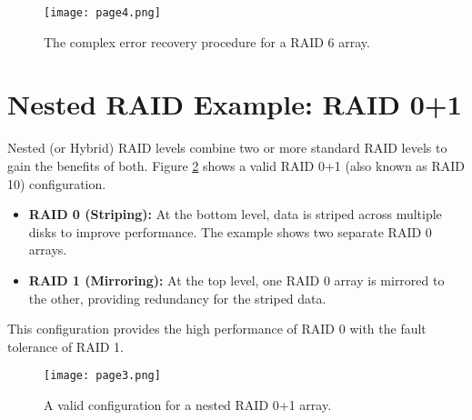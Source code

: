 \begin{figure}[h!]
    \centering
    \texttt{[image: page4.png]} %
    \caption{The complex error recovery procedure for a RAID 6 array.}
    \label{fig:raid6_recovery}
\end{figure}

\section{Nested RAID Example: RAID 0+1}

Nested (or Hybrid) RAID levels combine two or more standard RAID levels to gain the benefits of both. Figure \ref{fig:raid01_config} shows a valid RAID 0+1 (also known as RAID 10) configuration.

\begin{itemize}
    \item \textbf{RAID 0 (Striping):} At the bottom level, data is striped across multiple disks to improve performance. The example shows two separate RAID 0 arrays.
    \item \textbf{RAID 1 (Mirroring):} At the top level, one RAID 0 array is mirrored to the other, providing redundancy for the striped data.
\end{itemize}
This configuration provides the high performance of RAID 0 with the fault tolerance of RAID 1.

\begin{figure}[h!]
    \centering
    \texttt{[image: page3.png]} %
    \caption{A valid configuration for a nested RAID 0+1 array.}
    \label{fig:raid01_config}
\end{figure}